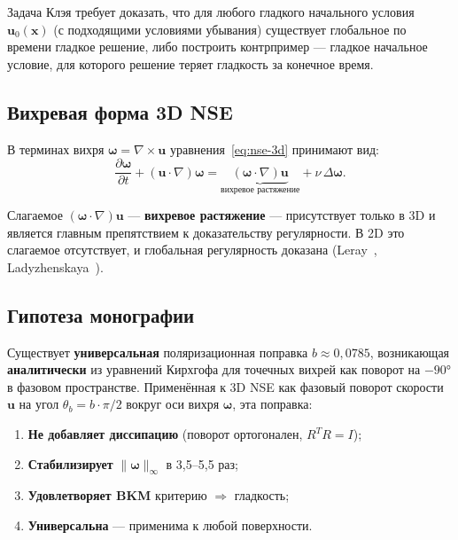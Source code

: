\documentclass[11pt,a4paper,twoside]{article}
\theoremstyle{remark}
\begin{document}
Задача Клэя требует доказать, что для любого гладкого начального условия $\mathbf{u}_0(\mathbf{x})$ (с подходящими условиями убывания) существует глобальное по времени гладкое решение, либо построить контрпример --- гладкое начальное условие, для которого решение теряет гладкость за конечное время.

\subsection{Вихревая форма 3D NSE}

В терминах вихря $\boldsymbol{\omega} = \nabla\times\mathbf{u}$ уравнения~\eqref{eq:nse-3d} принимают вид:
\begin{equation}
\frac{\partial\boldsymbol{\omega}}{\partial t} + (\mathbf{u}\cdot\nabla)\boldsymbol{\omega} = \underbrace{(\boldsymbol{\omega}\cdot\nabla)\mathbf{u}}_{\text{вихревое растяжение}} + \nu\,\Delta\boldsymbol{\omega}.
\label{eq:nse-vorticity}
\end{equation}

Слагаемое $(\boldsymbol{\omega}\cdot\nabla)\mathbf{u}$ --- \textbf{вихревое растяжение} --- присутствует только в 3D и является главным препятствием к доказательству регулярности. В 2D это слагаемое отсутствует, и глобальная регулярность доказана (Leray~\cite{leray1934}, Ladyzhenskaya~\cite{ladyzhenskaya1969}).

\subsection{Гипотеза монографии}

\begin{tcolorbox}[colback=accent!3!white, colframe=accent!80!black, title={Центральная гипотеза}]
Существует \textbf{универсальная} поляризационная поправка $b \approx 0{,}0785$, возникающая \textbf{аналитически} из уравнений Кирхгофа для точечных вихрей как поворот на $-90°$ в фазовом пространстве. Применённая к 3D NSE как фазовый поворот скорости $\mathbf{u}$ на угол $\theta_b = b\cdot\pi/2$ вокруг оси вихря $\boldsymbol{\omega}$, эта поправка:
\begin{enumerate}
    \item \textbf{Не добавляет диссипацию} (поворот ортогонален, $R^T R = I$);
    \item \textbf{Стабилизирует} $\|\boldsymbol{\omega}\|_\infty$ в 3{,}5--5{,}5 раз;
    \item \textbf{Удовлетворяет BKM} критерию $\Rightarrow$ гладкость;
    \item \textbf{Универсальна} --- применима к любой поверхности.
\end{enumerate}
\end{tcolorbox}
\end{document}

